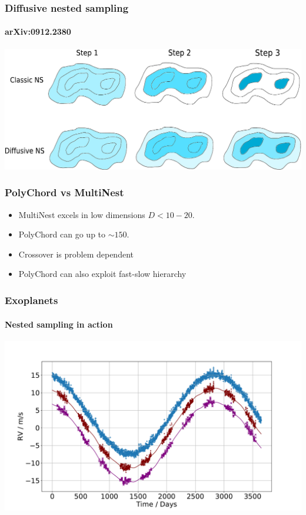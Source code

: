 \documentclass[%
]{beamer}
\begin{document}
\begin{frame}
  \frametitle{Diffusive nested sampling}
  \framesubtitle{arXiv:0912.2380}
  \includegraphics[width=\textwidth]{figures/dnest.pdf}
\end{frame}

\begin{frame}
\frametitle{PolyChord vs MultiNest}
\begin{itemize}
    \item MultiNest excels in low dimensions $D<10-20$.
    \item PolyChord can go up to $\sim 150$.
    \item Crossover is problem dependent
    \item PolyChord can also exploit fast-slow hierarchy
\end{itemize}
\end{frame}

\begin{frame}
  \frametitle{Exoplanets}
  \framesubtitle{Nested sampling in action}
  \includegraphics[width=\textwidth]{figures/rv_full.pdf}
\end{frame}
\end{document}
